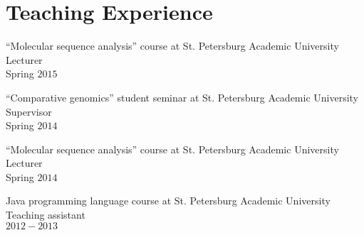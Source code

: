 \blankline

\section{Teaching Experience}
``Molecular sequence analysis'' course at St. Petersburg Academic University\\
Lecturer\\
Spring $2015$

\blankline
``Comparative genomics'' student seminar at St. Petersburg Academic University\\
Supervisor\\
Spring $2014$

\blankline

``Molecular sequence analysis'' course at St. Petersburg Academic University\\
Lecturer\\
Spring $2014$

\blankline

Java programming language course at St. Petersburg Academic University\\
Teaching assistant\\ 
$2012-2013$



